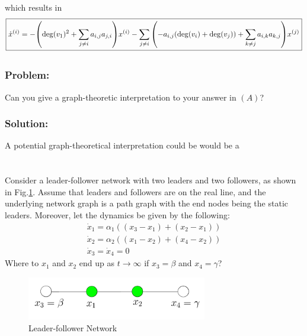 \documentclass[]{article}
\numberwithin{equation}{section}
\renewcommand{\figurename}{Fig.}
\begin{document}
which results in \[\boxed{
    \dot{x}^{(i)} = - \qty(\deg(v_1)^2 + \sum_{j \neq i} a_{i,j} a_{j,i}) x^{(i)} 
                    - \sum_{j \neq i} \qty(-a_{i,j} (\deg(v_i) + \deg(v_j)) + \sum_{k \neq j} a_{i,k} a_{k,j}) x^{(j)}
}\]

\subsection{}
\subsubsection*{Problem:}
Can you give a graph-theoretic interpretation to your answer in $(A)$?






\subsubsection*{Solution:}
A potential graph-theoretical interpretation could be would be a 










\newpage
\section{}
Consider a leader-follower network with two leaders and two followers, as shown in \figurename \ref{fig:pblm3}. 
Assume that leaders and followers are on the real line, and the underlying network graph is a path graph with the end nodes being the static leaders.
Moreover, let the dynamics be given by the following:
\begin{gather*}
    \dot{x}_1 = \alpha_1((x_3-x_1) + (x_2 - x_1))\\
    \dot{x}_2 = \alpha_2((x_1-x_2) + (x_4 - x_2))\\
    \dot{x}_3 = \dot{x}_4 = 0
\end{gather*}
Where to $x_1$ and $x_2$ end up as $t \to \infty$ if $x_3 = \beta$ and $x_4 = \gamma$?

\begin{figure}[h]
    \centering
    \includegraphics[width=0.7\textwidth]{figs/pblm3.png}
    \caption{Leader-follower Network}
    \label{fig:pblm3}
\end{figure}
\end{document}

